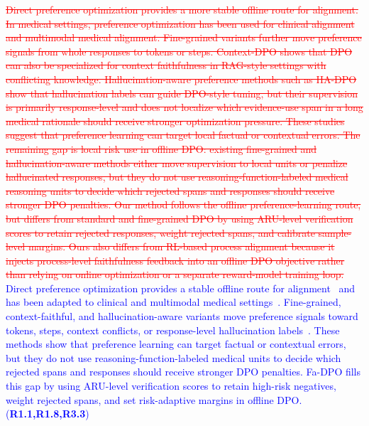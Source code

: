 \documentclass[a4paper,fleqn,doubleblind]{cas-sc}
\DeclareRobustCommand{\deleted}[1]{\textcolor{red}{\sout{#1}}}
\DeclareRobustCommand{\added}[1]{\textcolor{blue}{#1}}
\DeclareRobustCommand{\revtag}[1]{\textcolor{blue}{\scriptsize\,(\textbf{#1})}}
\begin{document}
\deleted{Direct preference optimization provides a more stable offline route for alignment. In medical settings, preference optimization has been used for clinical alignment and multimodal medical alignment. Fine-grained variants further move preference signals from whole responses to tokens or steps. Context-DPO shows that DPO can also be specialized for context faithfulness in RAG-style settings with conflicting knowledge. Hallucination-aware preference methods such as HA-DPO show that hallucination labels can guide DPO-style tuning, but their supervision is primarily response-level and does not localize which evidence-use span in a long medical rationale should receive stronger optimization pressure. These studies suggest that preference learning can target local factual or contextual errors. The remaining gap is local risk use in offline DPO: existing fine-grained and hallucination-aware methods either move supervision to local units or penalize hallucinated responses, but they do not use reasoning-function-labeled medical reasoning units to decide which rejected spans and responses should receive stronger DPO penalties. Our method follows the offline preference-learning route, but differs from standard and fine-grained DPO by using ARU-level verification scores to retain rejected responses, weight rejected spans, and calibrate sample-level margins. Ours also differs from RL-based process alignment because it injects process-level faithfulness feedback into an offline DPO objective rather than relying on online optimization or a separate reward-model training loop.}
\added{Direct preference optimization provides a stable offline route for alignment~\cite{rafailov2023direct, meng2024simpo} and has been adapted to clinical and multimodal medical settings~\cite{savage2025finetuning, zhu2025mmedpo}. Fine-grained, context-faithful, and hallucination-aware variants move preference signals toward tokens, steps, context conflicts, or response-level hallucination labels~\cite{gu2025maskdpo, zhou2025treg, yang2025sepo, xu2025fullstepdpo, bi2025contextdpo, zhao2024hadpo}. These methods show that preference learning can target factual or contextual errors, but they do not use reasoning-function-labeled medical units to decide which rejected spans and responses should receive stronger DPO penalties. Fa-DPO fills this gap by using ARU-level verification scores to retain high-risk negatives, weight rejected spans, and set risk-adaptive margins in offline DPO.}\revtag{R1.1,R1.8,R3.3}
\end{document}
